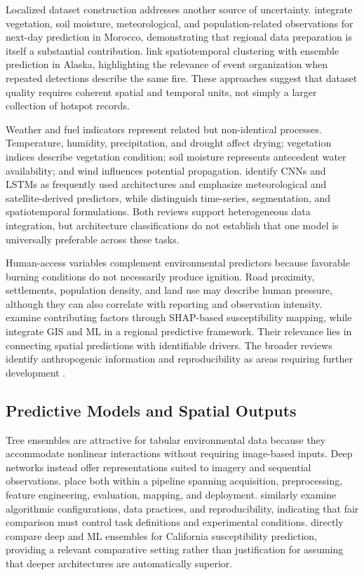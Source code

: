 \documentclass[pdflatex,sn-mathphys-num]{sn-jnl}
\begin{document}
Localized dataset construction addresses another source of uncertainty. \cite{jadouli2024morocco} integrate vegetation, soil moisture, meteorological, and population-related observations for next-day prediction in Morocco, demonstrating that regional data preparation is itself a substantial contribution. \cite{ahajjam2025alaska} link spatiotemporal clustering with ensemble prediction in Alaska, highlighting the relevance of event organization when repeated detections describe the same fire. These approaches suggest that dataset quality requires coherent spatial and temporal units, not simply a larger collection of hotspot records.

Weather and fuel indicators represent related but non-identical processes. Temperature, humidity, precipitation, and drought affect drying; vegetation indices describe vegetation condition; soil moisture represents antecedent water availability; and wind influences potential propagation. \cite{mambile2024systematic} identify CNNs and LSTMs as frequently used architectures and emphasize meteorological and satellite-derived predictors, while \cite{xu2025deep} distinguish time-series, segmentation, and spatiotemporal formulations. Both reviews support heterogeneous data integration, but architecture classifications do not establish that one model is universally preferable across these tasks.

Human-access variables complement environmental predictors because favorable burning conditions do not necessarily produce ignition. Road proximity, settlements, population density, and land use may describe human pressure, although they can also correlate with reporting and observation intensity. \cite{iban2024shap} examine contributing factors through SHAP-based susceptibility mapping, while \cite{bouzeraa2025wsm} integrate GIS and ML in a regional predictive framework. Their relevance lies in connecting spatial predictions with identifiable drivers. The broader reviews identify anthropogenic information and reproducibility as areas requiring further development \cite{mambile2024systematic,galvanlara2026systematic}.

\subsection{Predictive Models and Spatial Outputs}

Tree ensembles are attractive for tabular environmental data because they accommodate nonlinear interactions without requiring image-based inputs. Deep networks instead offer representations suited to imagery and sequential observations. \cite{ejaz2025pipeline} place both within a pipeline spanning acquisition, preprocessing, feature engineering, evaluation, mapping, and deployment. \cite{galvanlara2026systematic} similarly examine algorithmic configurations, data practices, and reproducibility, indicating that fair comparison must control task definitions and experimental conditions. \cite{biswas2025geoai} directly compare deep and ML ensembles for California susceptibility prediction, providing a relevant comparative setting rather than justification for assuming that deeper architectures are automatically superior.
\end{document}
